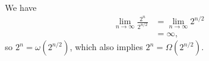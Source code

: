 We have
\begin{align*}
    \lim_{n\to\infty}\frac{2^n}{2^{n/2}} &= \lim_{n\to\infty}2^{n/2} \\
    &= \infty,
\end{align*}
so $2^n=\omega(2^{n/2})$, which also implies $2^n=\Omega(2^{n/2})$.
